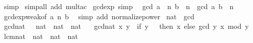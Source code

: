 \begin{isabellebody}
\ simp\isanewline
{}\isamarkupfalse%
\ {\isacharparenleft}{\kern0pt}simp{\isacharunderscore}{\kern0pt}all\ add{\isacharcolon}{\kern0pt}\ mult{\isacharunderscore}{\kern0pt}ac{\isacharparenright}{\kern0pt}%
\endisatagproof
{\isafoldproof}%
%
\isadelimproof
\isanewline
%
\endisadelimproof
\isanewline
{}\isamarkupfalse%
\ gcd{\isacharunderscore}{\kern0pt}exp\ {\isacharbrackleft}{\kern0pt}simp{\isacharbrackright}{\kern0pt}{\isacharcolon}{\kern0pt}\isanewline
\ \ {\isachardoublequoteopen}gcd\ {\isacharparenleft}{\kern0pt}a\ {\isacharcircum}{\kern0pt}\ n{\isacharparenright}{\kern0pt}\ {\isacharparenleft}{\kern0pt}b\ {\isacharcircum}{\kern0pt}\ n{\isacharparenright}{\kern0pt}\ {\isacharequal}{\kern0pt}\ gcd\ a\ b\ {\isacharcircum}{\kern0pt}\ n{\isachardoublequoteclose}\isanewline
%
\isadelimproof
\ \ %
\endisadelimproof
%
\isatagproof
{}\isamarkupfalse%
\ gcd{\isacharunderscore}{\kern0pt}exp{\isacharunderscore}{\kern0pt}weak{\isacharbrackleft}{\kern0pt}of\ a\ n\ b{\isacharbrackright}{\kern0pt}\ \isamarkupfalse%
\ {\isacharparenleft}{\kern0pt}simp\ add{\isacharcolon}{\kern0pt}\ normalize{\isacharunderscore}{\kern0pt}power{\isacharparenright}{\kern0pt}%
\endisatagproof
{\isafoldproof}%
%
\isadelimproof
\isanewline
%
\endisadelimproof
\isanewline
{}\isamarkupfalse%
%
\isadelimdocument
%
\endisadelimdocument
%
\isatagdocument
%
\isamarkuptrue%
%
\endisatagdocument
{\isafolddocument}%
%
\isadelimdocument
%
\endisadelimdocument
{}\isamarkupfalse%
\ nat\ {\isacharcolon}{\kern0pt}{\isacharcolon}{\kern0pt}\ gcd\isanewline
{}\isanewline
\isanewline
{}\isamarkupfalse%
\ gcd{\isacharunderscore}{\kern0pt}nat\ \ {\isacharcolon}{\kern0pt}{\isacharcolon}{\kern0pt}\ {\isachardoublequoteopen}nat\ {\isasymRightarrow}\ nat\ {\isasymRightarrow}\ nat{\isachardoublequoteclose}\isanewline
\ \ \ {\isachardoublequoteopen}gcd{\isacharunderscore}{\kern0pt}nat\ x\ y\ {\isacharequal}{\kern0pt}\ {\isacharparenleft}{\kern0pt}if\ y\ {\isacharequal}{\kern0pt}\ {}\ then\ x\ else\ gcd\ y\ {\isacharparenleft}{\kern0pt}x\ mod\ y{\isacharparenright}{\kern0pt}{\isacharparenright}{\kern0pt}{\isachardoublequoteclose}\isanewline
\isanewline
{}\isamarkupfalse%
\ lcm{\isacharunderscore}{\kern0pt}nat\ {\isacharcolon}{\kern0pt}{\isacharcolon}{\kern0pt}\ {\isachardoublequoteopen}nat\ {\isasymRightarrow}\ nat\ {\isasymRightarrow}\ nat{\isachardoublequoteclose}\isanewline

\end{isabellebody}
